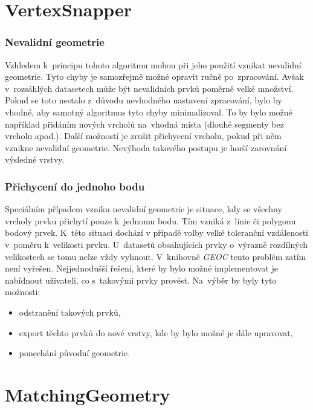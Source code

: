 \section{VertexSnapper}
\label{problemy-vs}
\subsubsection{Nevalidní geometrie}
Vzhledem k~principu tohoto algoritmu mohou při jeho použití vznikat nevalidní 
geometrie. Tyto chyby je samozřejmě možné opravit ručně po~zpracování. Avšak
v~rozsáhlých datasetech může být nevalidních prvků poměrně velké množství.
Pokud se toto nestalo z~důvodu nevhodného nastavení zpracování, bylo by 
vhodné, aby samotný algoritmus tyto chyby minimalizoval. To by bylo možné 
například přidáním nových vrcholů na~vhodná místa (dlouhé segmenty bez vrcholu
apod.). Další možností je zrušit přichycení vrcholu, pokud při něm vznikne
nevalidní geometrie. Nevýhoda takového postupu je horší zarovnání výsledné 
vrstvy. 

\subsubsection{Přichycení do jednoho bodu}
Speciálním případem vzniku nevalidní geometrie je situace, kdy se všechny 
vrcholy prvku přichytí pouze k~jednomu bodu. Tím vzniká z~linie či polygonu
bodový prvek. K~této situaci dochází v případě volby velké toleranční 
vzdálenosti v~poměru k~velikosti prvku. U~datasetů obsahujících prvky
o~výrazně rozdílných velikostech se tomu nelze vždy vyhnout. V~knihovně
\textit{GEOC} tento problém zatím není vyřešen. Nejjednodušší řešení, které
by bylo možné implementovat je nabídnout uživateli, co s~takovými prvky provést.
Na~výběr by byly tyto možnosti:
\begin{itemize}
 \item odstranění takových prvků,
 \item export těchto prvků do nové vrstvy, kde by bylo možné je dále upravovat,
 \item ponechání původní geometrie. 
\end{itemize}


\section{MatchingGeometry}
\label{problemy-mg}

